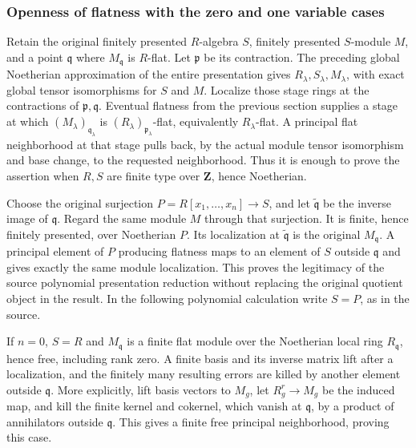 \subsubsection{Openness of flatness with the zero and one variable cases}\label{algebra-proof-039-openness-of-flatness-with-the-zero-and-one-variable-cases}

Retain the original finitely presented \(R\)-algebra \(S\), finitely presented \(S\)-module \(M\), and a point \(\mathfrak q\) where \(M_{\mathfrak q}\) is \(R\)-flat. Let \(\mathfrak p\) be its contraction. The preceding global Noetherian approximation of the entire presentation gives \(R_\lambda,S_\lambda,M_\lambda\), with exact global tensor isomorphisms for \(S\) and \(M\). Localize those stage rings at the contractions of \(\mathfrak p,\mathfrak q\). Eventual flatness from the previous section supplies a stage at which \((M_\lambda)_{\mathfrak q_\lambda}\) is \((R_\lambda)_{\mathfrak p_\lambda}\)-flat, equivalently \(R_\lambda\)-flat. A principal flat neighborhood at that stage pulls back, by the actual module tensor isomorphism and base change, to the requested neighborhood. Thus it is enough to prove the assertion when \(R,S\) are finite type over \(\mathbf Z\), hence Noetherian.

Choose the original surjection \(P=R[x_1,\ldots,x_n]\to S\), and let \(\widetilde{\mathfrak q}\) be the inverse image of \(\mathfrak q\). Regard the same module \(M\) through that surjection. It is finite, hence finitely presented, over Noetherian \(P\). Its localization at \(\widetilde{\mathfrak q}\) is the original \(M_{\mathfrak q}\). A principal element of \(P\) producing flatness maps to an element of \(S\) outside \(\mathfrak q\) and gives exactly the same module localization. This proves the legitimacy of the source polynomial presentation reduction without replacing the original quotient object in the result. In the following polynomial calculation write \(S=P\), as in the source.

If \(n=0\), \(S=R\) and \(M_{\mathfrak q}\) is a finite flat module over the Noetherian local ring \(R_{\mathfrak q}\), hence free, including rank zero. A finite basis and its inverse matrix lift after a localization, and the finitely many resulting errors are killed by another element outside \(\mathfrak q\). More explicitly, lift basis vectors to \(M_g\), let \(R_g^r\to M_g\) be the induced map, and kill the finite kernel and cokernel, which vanish at \(\mathfrak q\), by a product of annihilators outside \(\mathfrak q\). This gives a finite free principal neighborhood, proving this case.

